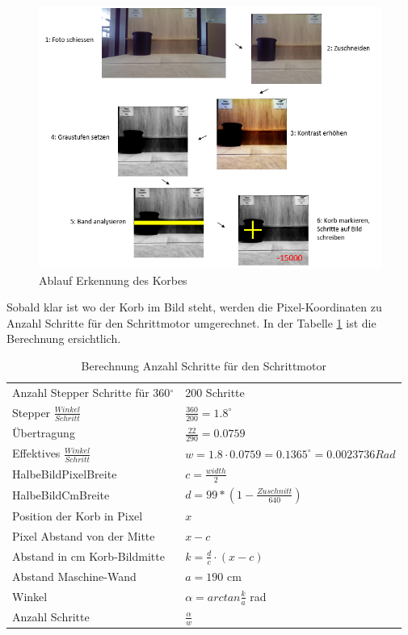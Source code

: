 \begin{figure}[h!]
	\centering
	\includegraphics[width=0.8\linewidth]{../../fig/algorithmus-korb-erkennung.png}
	\caption{Ablauf Erkennung des Korbes}
	\label{fig:ablauf-ortung-des-korbes-algorithmus}
\end{figure}

\newpage
Sobald klar ist wo der Korb im Bild steht, werden die Pixel-Koordinaten zu Anzahl Schritte für den Schrittmotor umgerechnet. In der Tabelle \ref{tab:berechnung-steps} ist die Berechnung ersichtlich. 

\begin{table}[h!]
	\renewcommand{\arraystretch}{1.5}
	\centering
	\begin{tabular}{l l}
		Anzahl Stepper Schritte für 360$^\circ$ & 200 Schritte \\
		Stepper $\frac{Winkel}{Schritt}$ & $\frac{360}{200} = 1.8^\circ$ \\
		Übertragung & $\frac{22}{290} = 0.0759$ \\
		Effektives $\frac{Winkel}{Schritt}$ & $w = 1.8 \cdot 0.0759 = 0.1365^\circ = 0.0023736 Rad$ \\
		HalbeBildPixelBreite & $c = \frac{width}{2}$ \\
		HalbeBildCmBreite & $d = 99*(1-\frac{Zuschnitt}{640})$ \\
		Position der Korb in Pixel & $x$ \\
		Pixel Abstand von der Mitte & $x - c$ \\
		Abstand in cm Korb-Bildmitte & $k = \frac{d}{c} \cdot (x-c)$ \\
		Abstand Maschine-Wand & $a = 190$ cm \\
		Winkel & $\alpha = arctan\frac{k}{a}$ rad \\
		Anzahl Schritte & $\frac{\alpha}{w}$ \\
	\end{tabular}
	\label{tab:berechnung-steps}
	\caption{Berechnung Anzahl Schritte für den Schrittmotor}
\end{table}

